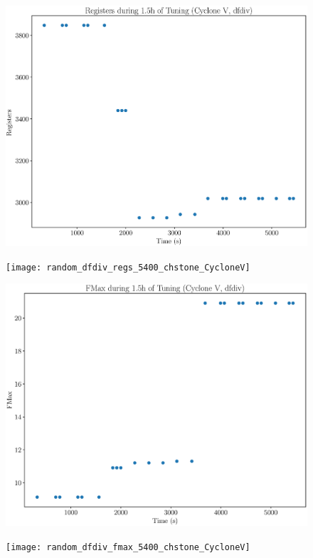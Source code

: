 \documentclass[12pt, a4paper]{article}
\begin{document}
\begin{figure}[htpb]
    \begin{minipage}{.48\textwidth}
        \includegraphics[scale=.25]{dfdiv_regs_5400_chstone_CycloneV}
    \end{minipage}%
    \hfill
    \begin{minipage}{.48\textwidth}
        \texttt{[image: random\_dfdiv\_regs\_5400\_chstone\_CycloneV]}
    \end{minipage}%

    \begin{minipage}{.48\textwidth}
        \includegraphics[scale=.25]{dfdiv_fmax_5400_chstone_CycloneV}
    \end{minipage}%
    \hfill
    \begin{minipage}{.48\textwidth}
        \texttt{[image: random\_dfdiv\_fmax\_5400\_chstone\_CycloneV]}
    \end{minipage}%
\end{figure}
\end{document}
